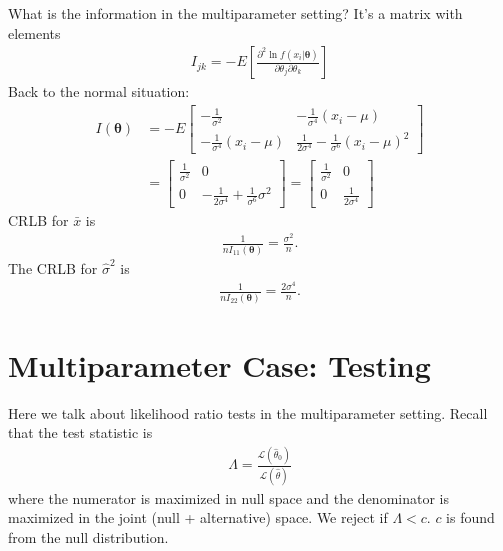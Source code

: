 \documentclass{book}
\theoremstyle{definition}
\newcommand{\p}{\partial}
\newcommand{\lag}{\mathcal{L}}
\newcommand{\f}[2]{\frac{#1}{#2}}
\newcommand{\lb}{\left[}
\newcommand{\rb}{\right]}
\begin{document}
What is the information in the multiparameter setting? It's a matrix with elements
\begin{align}
\boxed{I_{jk} = -E \lb \f{\p^2 \ln f(x_i\vert \bm\theta)}{\p \theta_j \p\theta_k} \rb}
\end{align}
Back to the normal situation:
\begin{align}
I(\bm\theta) &= -E \begin{bmatrix}
-\f{1}{\sigma^2} & -\f{1}{\sigma^4}(x_i - \mu) \\
 -\f{1}{\sigma^4}(x_i - \mu) & \f{1}{2\sigma^4} - \f{1}{\sigma^6}(x_i - \mu)^2
\end{bmatrix}\\& = \begin{bmatrix}
\f{1}{\sigma^2} & 0 \\
0 & -\f{1}{2\sigma^4} + \f{1}{\sigma^6}\sigma^2 
\end{bmatrix}
= 
\begin{bmatrix}
\f{1}{\sigma^2} & 0 \\ 0 & \f{1}{2\sigma^4}
\end{bmatrix}
\end{align}
CRLB for $\bar{x}$ is 
\begin{align}
\f{1}{n I_{11}(\bm\theta)} = \f{\sigma^2}{n}.
\end{align}
The CRLB for $\hat\sigma^2$ is 
\begin{align}
\f{1}{nI_{22}(\bm\theta)} = \f{2\sigma^4}{n}.
\end{align}














\section{Multiparameter Case: Testing}


Here we talk about likelihood ratio tests in the multiparameter setting. Recall that the test statistic is 
\begin{align}
\Lambda = \f{\lag(\hat\theta_0)}{\lag(\hat\theta)}  
\end{align}
where the numerator is maximized in null space and the denominator is maximized in the joint (null + alternative) space. We reject if $\Lambda < c$. $c$ is found from the null distribution. 
\end{document}
